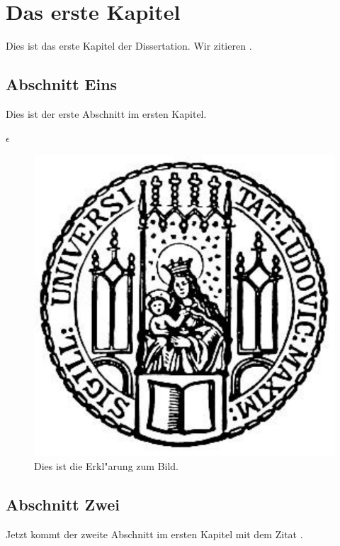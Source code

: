 \chapter{Das erste Kapitel}

Dies ist das erste Kapitel der Dissertation. Wir zitieren
\cite{Autor1:02}.


\section{Abschnitt Eins}

Dies ist der erste Abschnitt im ersten Kapitel.

$\epsilon$



\begin{figure}[htb]
  \centering
  \includegraphics[scale=0.5]{siegel}
  \caption[Kurzform f"ur das Abbildungsverzeichnis]{Dies ist die Erkl"arung zum Bild.}
\end{figure}


\section[Kurzform]{Abschnitt Zwei}

Jetzt kommt der zweite Abschnitt im ersten Kapitel
mit dem Zitat \cite{Autor2:01}.
